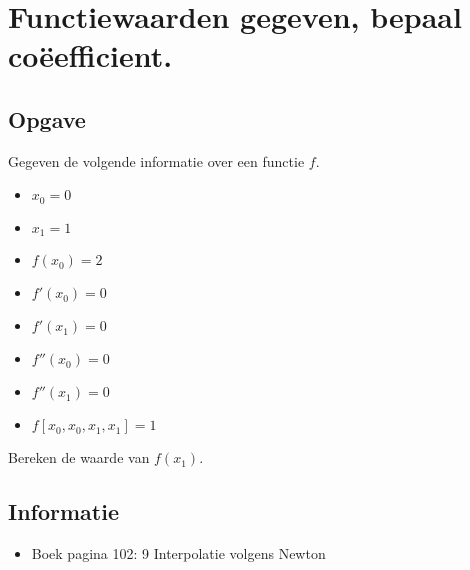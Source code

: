 \documentclass[examenvragen.tex]{subfiles}
\begin{document}
\section{Functiewaarden gegeven, bepaal co\"eefficient.}
\subsection{Opgave}
Gegeven de volgende informatie over een functie $f$.
\begin{multicols}{4}
\begin{itemize}
\item $x_0 = 0$
\item $x_1 = 1$
\item $f(x_0) = 2$
\item $f'(x_0) = 0$
\item $f'(x_1) = 0$
\item $f''(x_0) = 0$
\item $f''(x_1) = 0$
\item $f[x_0,x_0,x_1,x_1] = 1$
\end{itemize}
\end{multicols}
Bereken de waarde van $f(x_1)$.

\subsection{Informatie}
\begin{itemize}
\item Boek pagina 102: 9 Interpolatie volgens Newton
\end{itemize}
\end{document}
